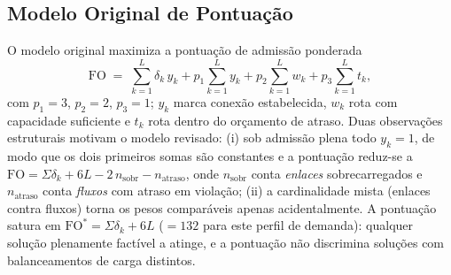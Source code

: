 \documentclass[journal]{IEEEtran}
\newcommand{\FO}{\mathrm{FO}}
\begin{document}
\subsection{Modelo Original de Pontuação}
\label{sec:origfo}
O modelo original maximiza a pontuação de admissão ponderada
\begin{equation}
\FO \;=\; \sum_{k=1}^{L}\delta_k\,y_k
   + p_1\sum_{k=1}^{L} y_k
   + p_2\sum_{k=1}^{L} w_k
   + p_3\sum_{k=1}^{L} t_k,
\label{eq:fo}
\end{equation}
com $p_1{=}3$, $p_2{=}2$, $p_3{=}1$; $y_k$ marca conexão estabelecida, $w_k$
rota com capacidade suficiente e $t_k$ rota dentro do orçamento de atraso.
Duas observações estruturais motivam o modelo revisado: (i) sob admissão
plena todo $y_k=1$, de modo que os dois primeiros somas são constantes e a
pontuação reduz-se a $\FO = \Sigma\delta_k + 6L - 2\,n_{\mathrm{sobr}} -
n_{\mathrm{atraso}}$, onde $n_{\mathrm{sobr}}$ conta \emph{enlaces}
sobrecarregados e $n_{\mathrm{atraso}}$ conta \emph{fluxos} com atraso em
violação; (ii) a cardinalidade mista (enlaces contra fluxos) torna os pesos
comparáveis apenas acidentalmente. A pontuação satura em
$\FO^{*}=\Sigma\delta_k+6L$ ($=132$ para este perfil de demanda): qualquer solução plenamente factível a atinge, e
a pontuação não discrimina soluções com balanceamentos de carga distintos.
\end{document}
